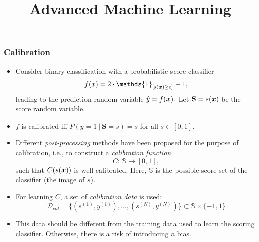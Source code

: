 



\newcommand{\sens}{\mathbf{A}} %
\newcommand{\ba}{\mathbf{a}}
\newcommand{\batilde}{\tilde{\mathbf{a}}}
\newcommand{\Px}{\mathbb{P}_{x}} %
\newcommand{\Pxj}{\mathbb{P}_{x_j}} %
\newcommand{\indep}{\perp \!\!\! \perp} %

\usepackage{multicol}

\newcommand{\titlefigure}{figure/pic-pava}
\newcommand{\learninggoals}{
  \item Get to know the three common methods for calibration
}

\title{Advanced Machine Learning}
\date{}






\sloppy

\begin{frame}[t]
	\frametitle{Calibration}
	\small
	\begin{itemize}
%		
		\item Consider binary classification with a probabilistic score  classifier
%		
		$$\fx = 2 \cdot \mathds{1}_{[ s(\xv) \ge c]} -1,$$
%		
		leading to the prediction random variable $\hat{y} = f(\bm{x}).$ Let $\mathbf{S}=s(\bm{x})$ be the score random variable. 
%		
		\item $f$ is calibrated iff $P(y=1~|~\mathbf{S}=s) = s$ for all $s\in [0,1].$
%		
		\item Different \emph{post-processing} methods have been proposed for the purpose of calibration, i.e., to construct a \emph{calibration function} 
%		
		$$C: \, \mathbb{S} \to [0,1], $$
		such that $C(s(\bm{x}))$ is well-calibrated.
%		
		Here, $\mathbb{S}$ is the possible score set of the classifier (the image of $s$).
		
		\item For learning $C$, a set of \emph{calibration data} is used:
		$$
		\mathcal{D}_{cal} = \big\{ (s^{(1)}, y^{(1)}) , \ldots , (s^{(N)}, y^{(N)}) \big\} \subset \mathbb{S} \times \{ -1 , 1 \}
		$$ 
		
		\item This data should be different from the training data used to learn the scoring classifier. Otherwise, there is a risk of introducing a bias. 
		
	\end{itemize}
\end{frame}

